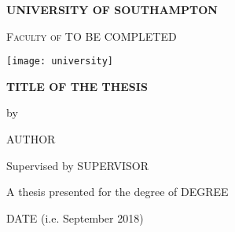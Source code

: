 
\begin{titlepage}
	\begin{center}
		\vspace*{0.8cm}
		
		\huge{\textbf{UNIVERSITY OF SOUTHAMPTON}}

		\vspace*{1cm}		

		\Large{\textsc{Faculty of TO BE COMPLETED}}
		
		\vspace*{1cm}
			\texttt{[image: university]}
		
		\vspace*{0.8cm}
		
		\huge{\textbf{TITLE OF THE THESIS}}
		
		\vspace*{0.8cm}
		
		\Large{by}
		
		\vspace*{0.8cm}
		
		\huge{AUTHOR}
		
		\vfill
		
		\Large{Supervised by SUPERVISOR}
		
		\vspace*{0.8cm}
		
		A thesis presented for the degree of DEGREE
		
		\vspace*{0.75cm}
		
		DATE (i.e. September 2018)
	
	
	\end{center}
\end{titlepage}